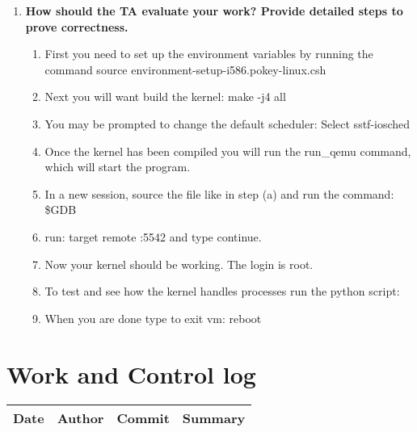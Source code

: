 \documentclass[letterpaper,10pt,notitlepage,fleqn]{article}
\begin{document}
\begin{enumerate}
\item \textbf{How should the TA evaluate your work? Provide detailed steps to prove correctness.} 	\begin{enumerate}
	\item First you need to set up the environment variables by running the command source environment-setup-i586.pokey-linux.csh
    \item Next you will want build the kernel: make -j4 all
    \item You may be prompted to change the default scheduler: Select sstf-iosched
    \item Once the kernel has been compiled you will run the run\_qemu command, which will start the program.
    \item In a new session, source the file like in step (a) and run the command: \$GDB 
    \item run: target remote :5542 and type continue.
    \item Now your kernel should be working. The login is root. 
    \item To test and see how the kernel handles processes run the python script: 
    \item When you are done type to exit vm: reboot 
	\end{enumerate}
\end{enumerate}

\section{Work and Control log}
\begin{center}
    \begin{tabular}{| p{3cm} | l | l | p{5cm} |}    
    	\hline
        Date & Author & Commit & Summary \\ \hline
        
	
	\end{tabular}
\end{center}
\end{document}
